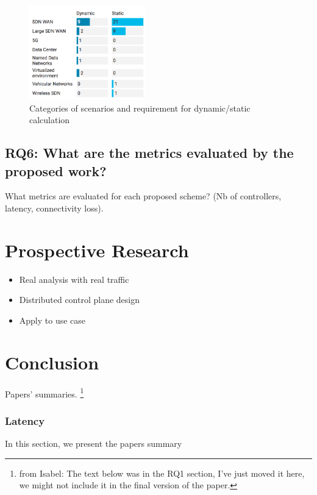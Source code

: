\documentclass{IEEEtran}
\newcommand\fia[1]{{\color{red}\footnote{\color{red}from Isabel: #1}}} %
\begin{document}
\begin{figure}
    \centering
    \includegraphics[width=0.45\textwidth]{Pictures/Scenarios3.png}
    \caption{Categories of scenarios and requirement for dynamic/static calculation}
    \label{fig:Scenarios3}
\end{figure}







\subsection{RQ6: What are the metrics evaluated by the proposed work?}
What metrics are evaluated for each proposed scheme? (Nb of controllers, latency, connectivity loss).


\section{Prospective Research}
\begin{itemize}
\item Real analysis with real traffic
\item Distributed control plane design
\item Apply to use case
\end{itemize}

\section{Conclusion}
\medskip
\tableofcontents


\appendix

Papers' summaries. \fia{The text below was in the RQ1 section, I've just moved it here, we might not include it in the final version of the paper.}


\subsubsection{Latency}
In this section, we present the papers summary %
\end{document}
